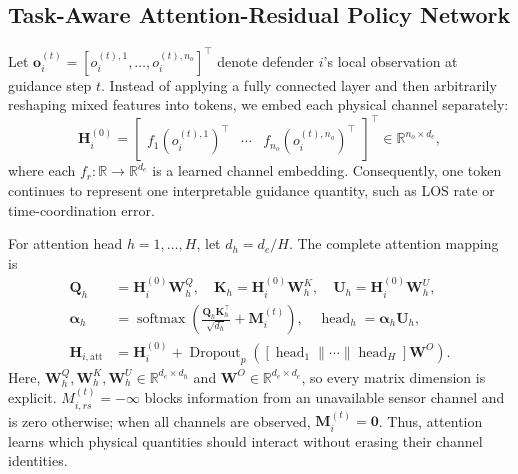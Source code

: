 \documentclass[lettersize,journal]{IEEEtran}
\begin{document}
\subsection{Task-Aware Attention-Residual Policy Network}
\label{subsec:attention_residual}

Let $\mathbf o_i^{(t)}=[o_i^{(t),1},\ldots,o_i^{(t),n_o}]^{\top}$ denote defender $i$'s
local observation at guidance step $t$. Instead of applying a fully connected layer and then
arbitrarily reshaping mixed features into tokens, we embed each physical channel separately:
\begin{equation}
\label{eq:feature_tokens}
\mathbf H_i^{(0)}=
\begin{bmatrix}
f_1(o_i^{(t),1})^{\top} & \cdots & f_{n_o}(o_i^{(t),n_o})^{\top}
\end{bmatrix}^{\top}
\in\mathbb R^{n_o\times d_e},
\end{equation}
where each $f_r:\mathbb R\rightarrow\mathbb R^{d_e}$ is a learned channel embedding.
Consequently, one token continues to represent one interpretable guidance quantity, such as
LOS rate or time-coordination error.

For attention head $h=1,\ldots,H$, let $d_h=d_e/H$. The complete attention mapping is
\begin{equation}
\label{eq:task_attention}
\begin{aligned}
\mathbf Q_h&=\mathbf H_i^{(0)}\mathbf W_h^Q,\quad
\mathbf K_h=\mathbf H_i^{(0)}\mathbf W_h^K,\quad
\mathbf U_h=\mathbf H_i^{(0)}\mathbf W_h^U,\\
\boldsymbol{\alpha}_h&=\operatorname{softmax}
\left(\frac{\mathbf Q_h\mathbf K_h^{\top}}{\sqrt{d_h}}+\mathbf M_i^{(t)}\right),
\quad \operatorname{head}_h=\boldsymbol{\alpha}_h\mathbf U_h,\\
\mathbf H_{i,\mathrm{att}}&=\mathbf H_i^{(0)}+
\operatorname{Dropout}_p\!\left(
[\operatorname{head}_1\|\cdots\|\operatorname{head}_H]\mathbf W^O\right).
\end{aligned}
\end{equation}
Here, $\mathbf W_h^Q,\mathbf W_h^K,\mathbf W_h^U\in\mathbb R^{d_e\times d_h}$ and
$\mathbf W^O\in\mathbb R^{d_e\times d_e}$, so every matrix dimension is explicit.
$M_{i,rs}^{(t)}=-\infty$ blocks information from an unavailable sensor channel and is zero
otherwise; when all channels are observed, $\mathbf M_i^{(t)}=\mathbf0$. Thus, attention
learns which physical quantities should interact without erasing their channel identities.
\end{document}
